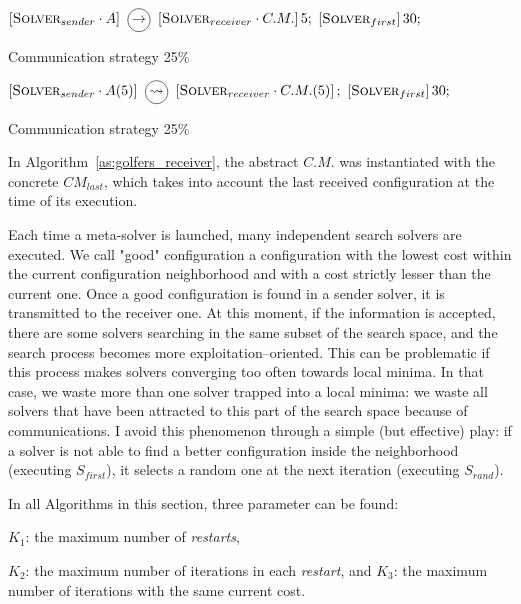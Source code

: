 \begin{algorithm}
\dontprintsemicolon
\SetNoline
$\left[\eqsolverposl{sender}\cdot A\right] \onetoone \left[\eqsolverposl{receiver}\cdot C.M.\right]5;$\;
$\left[\textbf{{\sc Solver}}_{first}\right]30;$
\caption{Communication strategy \oneTone{} 25\%}\label{comm:golfers_1_1-1_25}
\end{algorithm}

\begin{algorithm}
\dontprintsemicolon
\SetNoline
$\left[\eqsolverposl{sender}\cdot A(5)\right] \oneton \left[\eqsolverposl{receiver}\cdot C.M.(5)\right];$\;
$\left[\textbf{{\sc Solver}}_{first}\right]30;$
\caption{Communication strategy \oneTn{} 25\%}\label{comm:golfers_1_1-n_25}
\end{algorithm}

In Algorithm~\ref{as:golfers_receiver}, the abstract \opch{} $C.M.$ was instantiated with the concrete \opch{} $CM_{last}$, which takes into account the last received configuration at the time of its execution.

Each time a \posl{} meta-solver is launched, many independent search solvers are executed. We call "good" configuration a configuration with the lowest cost within the current configuration neighborhood and with a cost strictly lesser than the current one. Once a good configuration is found in a sender solver, it is transmitted to the receiver one. At this moment, if the information is accepted, there are some solvers searching in the same subset of the search space, and the search process becomes more exploitation--oriented. This can be problematic if this process makes solvers converging too often towards local minima. In that case, we waste more than one solver trapped into a local minima: we waste all solvers that have been attracted to this part of the search space because of communications. I avoid this phenomenon through a simple (but effective) play: if a solver is not able to find a better configuration inside the neighborhood (executing $S_{first}$), it selects a random one at the next iteration (executing $S_{rand}$).

In all Algorithms in this section, three parameter can be found:\begin{inparaenum}[1.] \item $K_1$: the maximum number of {\it restarts}, \item $K_2$: the maximum number of iterations in each \textit{restart}, and $K_3$: the maximum number of iterations with the same current cost. \item \end{inparaenum}

